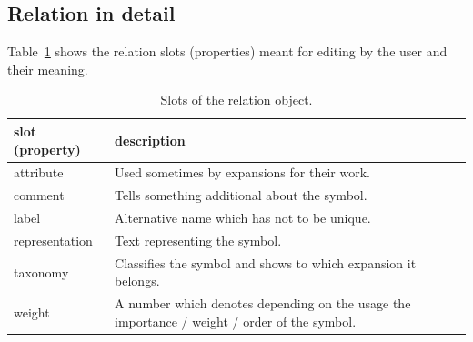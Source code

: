 \documentclass[a4paper, 12pt, openany]{scrbook}
\begin{document}
\subsection{Relation in detail}
Table~\ref{tab:relation} shows the relation slots (properties) meant for editing by the user and their meaning.
\begin{table}[htbp]
\centering
\begin{tabular}{|p{4cm}|p{12cm}|}
  \hline
  \textbf{slot (property)} & \textbf{description} \\
  \hline
  attribute & Used sometimes by expansions for their work. \\
  \hline
  comment & Tells something additional about the symbol. \\
  \hline
  label & Alternative name which has not to be unique. \\
  \hline
  representation & Text representing the symbol. \\
  \hline
  taxonomy & Classifies the symbol and shows to which expansion it belongs. \\
  \hline
  weight & A number which denotes depending on the usage the importance / weight / order of the symbol. \\
  \hline
\end{tabular}
\caption{Slots of the relation object.}
\label{tab:relation}
\end{table}
\end{document}
